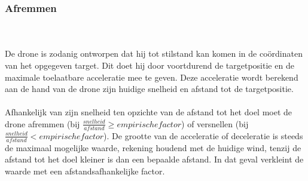 \subsubsection{Afremmen}
\\
\\
De drone is zodanig ontworpen dat hij tot stilstand kan komen in de co\"ordinaten van het opgegeven target. Dit doet hij door voortdurend de targetpositie en de maximale toelaatbare acceleratie mee te geven. Deze acceleratie wordt berekend aan de hand van de drone zijn huidige snelheid en afstand tot de targetpositie.
\\
\\
Afhankelijk van zijn snelheid ten opzichte van de afstand tot het doel moet de drone afremmen (bij $\frac{snelheid}{afstand}  \geq empirische factor$) of versnellen (bij $\frac{snelheid}{afstand}  < empirische factor$). De grootte van de acceleratie of deceleratie is steeds de maximaal mogelijke waarde, rekening houdend met de huidige wind, tenzij de afstand tot het doel kleiner is dan een bepaalde afstand. In dat geval verkleint de waarde met een afstandsafhankelijke factor.